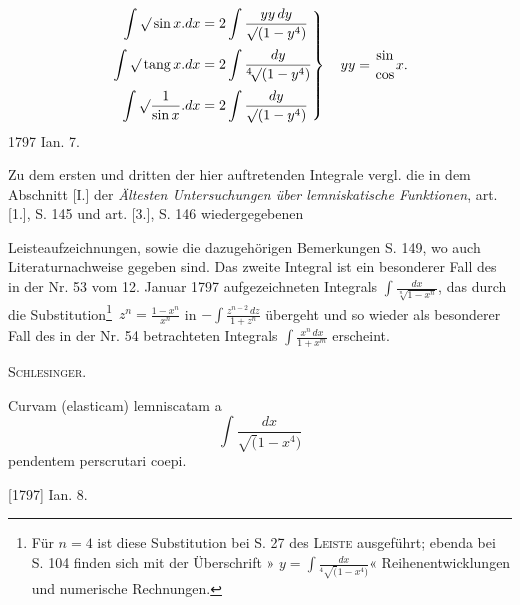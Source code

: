 \[
\left.\begin{aligned}
\int\surd\sin x.dx&=2\int\frac{yy\,dy}{\surd(1-y^4)}\\[.5ex]
\int\surd\operatorname{tang}x.dx&=2\int\frac{dy}{{}^{4}\!\surd(1-y^4)}\\[.5ex]
\int\surd\frac1{\sin x}.dx&=2\int\frac{dy}{\surd(1-y^4)}
\end{aligned}\right\}\quad yy=\genfrac{}{}{0pt}{}{\sin}{\cos}x.
\]
\noindent\hfill1797 Ian. 7.

\medskip\begingroup\small
\indent Zu dem ersten und dritten der hier auftretenden Integrale vergl. die in dem Abschnitt [I.] der \textit{Ältesten Untersuchungen über lemniskatische Funktionen}, art. [1.], S. 145 und art. [3.], S. 146 wiedergegebenen
\par\endgroup
\clearpage{}
\begingroup\small
\noindent Leisteaufzeichnungen, sowie die dazugehörigen Bemerkungen S. 149, wo auch Literaturnachweise gegeben sind. Das zweite Integral ist ein besonderer Fall des in der Nr. 53 vom 12. Januar 1797 aufgezeichneten Integrals \(\displaystyle\int\frac{dx}{\sqrt[n]{1-x^n}}\), das durch die Substitution\footnote{Für \(n=4\) ist diese Substitution bei S. 27 des \textsc{Leiste} ausgeführt; ebenda bei S. 104 finden sich mit der Überschrift » \(\displaystyle y=\int\frac{dx}{{}^{4}\!\surd(1-x^4)}\)« Reihenentwicklungen und numerische Rechnungen.}\ \(z^n=\frac{1-x^n}{x^n}\) in \(\displaystyle-\int\frac{z^{n-2}\,dz}{1+z^n}\) übergeht und so wieder als besonderer Fall des in der Nr. 54 betrachteten Integrals \(\displaystyle\int\frac{x^n\,dx}{1+x^m}\) erscheint.
\par\noindent\hfill\textsc{Schlesinger.}
\par\endgroup

\indent Curvam (elasticam) lemniscatam a
\[
\int\frac{dx}{\surd(1-x^4)}
\]
\noindent pendentem perscrutari coepi.
\par\noindent\hfill[1797] Ian. 8.

